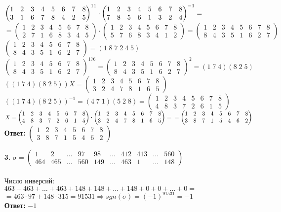 \documentclass[a4paper]{article}
\newcommand{\mat}[1]{\begin{pmatrix} #1 \end{pmatrix}}
\renewcommand{\r}{\Rightarrow}
\begin{document}
\begin{enumerate}
\begin{enumerate}
    \end{enumerate}
    $\mat{1 & 2 & 3 & 4 & 5 & 6 & 7 & 8 \\ 3 & 1 & 6 & 7 & 8 & 4 & 2 & 5}^{11}\cdot \mat{1 & 2 & 3 & 4 & 5 & 6 & 7 & 8 \\ 7 & 8 & 5 & 6 & 1 & 3 & 2 & 4}^{-1} =\\ $
    $= \mat{1 & 2 & 3 & 4 & 5 & 6 & 7 & 8 \\
    2 & 7 & 1 & 6 & 8 & 3 & 4 & 5} \cdot \mat{1 & 2 & 3 & 4 & 5 & 6 & 7 & 8 \\
    5 & 7 & 6 & 8 & 3 & 4 & 1 & 2} = \mat{1 & 2 & 3 & 4 & 5 & 6 & 7 & 8 \\
    8 & 4 & 3 & 5 & 1 & 6 & 2 & 7}$\\
    $\mat{1 & 2 & 3 & 4 & 5 & 6 & 7 & 8 \\
    8 & 4 & 3 & 5 & 1 & 6 & 2 & 7} = (1\; 8 \;7 \;2 \;4 \;5)$\\
    $\mat{1 & 2 & 3 & 4 & 5 & 6 & 7 & 8 \\
    8 & 4 & 3 & 5 & 1 & 6 & 2 & 7}^{176} =\mat{1 & 2 & 3 & 4 & 5 & 6 & 7 & 8 \\
    8 & 4 & 3 & 5 & 1 & 6 & 2 & 7}^{2} = (1 \; 7 \; 4)(8 \; 2 \; 5) $\\
    $((1 \; 7 \; 4)(8 \; 2 \; 5))X = \mat{1 & 2 & 3 & 4 & 5 & 6 & 7 & 8 \\ 3 & 2 & 4 & 7 & 8 & 1 & 6 & 5}$\\
    $((1 \; 7 \; 4)(8 \; 2 \; 5))^{-1} = (4\;7\;1)(5\;2\;8) = \mat{1 & 2 & 3 & 4 & 5 & 6 & 7 & 8 \\
    4 & 8 & 3 & 7 & 2 & 6 & 1 & 5}$\\
    $X = \mat{1 & 2 & 3 & 4 & 5 & 6 & 7 & 8 \\
    4 & 8 & 3 & 7 & 2 & 6 & 1 & 5} \cdot \mat{1 & 2 & 3 & 4 & 5 & 6 & 7 & 8 \\ 3 & 2 & 4 & 7 & 8 & 1 & 6 & 5}  =\\= \mat{1 & 2 & 3 & 4 & 5 & 6 & 7 & 8 \\ 3 & 8 & 7 & 1 & 5 & 4 & 6 & 2}$\\
    \textbf{Ответ: }$\mat{1 & 2 & 3 & 4 & 5 & 6 & 7 & 8 \\ 3 & 8 & 7 & 1 & 5 & 4 & 6 & 2}$

    \item[\textbf{3.}]
    $\sigma = \mat{1 & 2 & \dots & 97 & 98 & \dots & 412 & 413 & \dots & 560 \\ 464 & 465 & \dots & 560 & 149 & \dots & 463 & 1 & \dots & 148}$\\\\
    Число инверсий: $463 + 463 + \dots + 463 + 148 + 148 + \dots + 148 + 0 + 0 +\dots + 0 = $\\
    $= 463\cdot 97 + 148\cdot 315 = 91531 \r sgn(\sigma) = (-1)^{91531} = -1$\\
    \textbf{Ответ: } $-1$


\end{enumerate}
\end{document}
